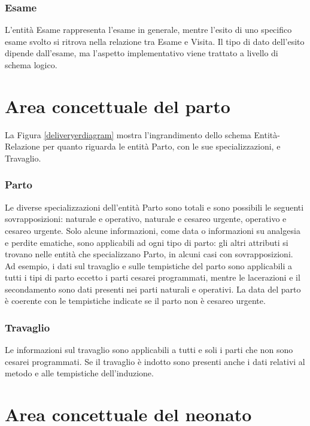 \subsubsection{Esame}

L'entità Esame rappresenta l'esame in generale, mentre l'esito di uno specifico esame svolto si ritrova nella relazione tra Esame e Visita.
Il tipo di dato dell'esito dipende dall'esame, ma l'aspetto implementativo viene trattato a livello di schema logico.

\section{Area concettuale del parto}
\label{deliveryconceptual}

La Figura \ref{deliveryerdiagram} mostra l'ingrandimento dello schema Entità-Relazione per quanto riguarda le entità Parto, con le sue specializzazioni, e Travaglio.

\subsubsection{Parto}

Le diverse specializzazioni dell'entità Parto sono totali e sono possibili le seguenti sovrapposizioni: naturale e operativo, naturale e cesareo urgente, operativo e cesareo urgente.
Solo alcune informazioni, come data o informazioni su analgesia e perdite ematiche, sono applicabili ad ogni tipo di parto: gli altri attributi si trovano nelle entità che specializzano Parto, in alcuni casi con sovrapposizioni.
Ad esempio, i dati sul travaglio e sulle tempistiche del parto sono applicabili a tutti i tipi di parto eccetto i parti cesarei programmati, mentre le lacerazioni e il secondamento sono dati presenti nei parti naturali e operativi.
La data del parto è coerente con le tempistiche indicate se il parto non è cesareo urgente.

\subsubsection{Travaglio}

Le informazioni sul travaglio sono applicabili a tutti e soli i parti che non sono cesarei programmati.
Se il travaglio è indotto sono presenti anche i dati relativi al metodo e alle tempistiche dell'induzione.

\section{Area concettuale del neonato}
\label{newbornconceptual}

